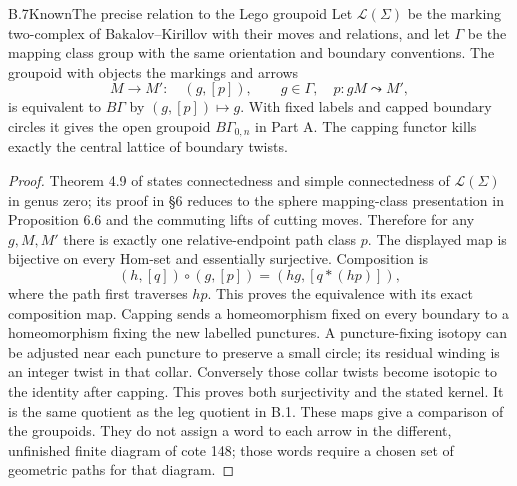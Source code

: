 \begin{result}{B.7}{Known}{The precise relation to the Lego groupoid}
Let $\mathcal L(\Sigma)$ be the marking two-complex of
Bakalov--Kirillov with their moves and relations, and let $\Gamma$
be the mapping class group with the same orientation and boundary
conventions.  The groupoid with objects the markings and arrows
\[
 M\longrightarrow M':\quad (g,[p]),\qquad
 g\in\Gamma,\quad p:gM\leadsto M',
\]
is equivalent to $B\Gamma$ by $(g,[p])\mapsto g$.  With fixed labels
and capped boundary circles it gives the open groupoid
$B\Gamma_{0,n}$ in Part A.  The capping functor kills exactly the
central lattice of boundary twists.
\end{result}
\begin{proof}
Theorem 4.9 of \citet{B_BakalovKirillov} states connectedness and
simple connectedness of $\mathcal L(\Sigma)$ in genus zero; its
proof in \S6 reduces to the sphere mapping-class presentation in
Proposition 6.6 and the commuting lifts of cutting moves.  Therefore
for any $g,M,M'$ there is exactly one relative-endpoint path class
$p$.  The displayed map is bijective on every Hom-set and
essentially surjective.  Composition is
\[
 (h,[q])\circ(g,[p])=(hg,[q*(hp)]),
\]
where the path first traverses $hp$.  This proves the equivalence
with its exact composition map.  Capping sends a homeomorphism
fixed on every boundary to a homeomorphism fixing the new labelled
punctures.  A puncture-fixing isotopy can be adjusted near each
puncture to preserve a small circle; its residual winding is an
integer twist in that collar.  Conversely those collar twists
become isotopic to the identity after capping.  This proves both
surjectivity and the stated kernel.  It is the same quotient as the
leg quotient in B.1.  These maps give a comparison of the groupoids.
They do not assign a word to each arrow in the different, unfinished
finite diagram of cote 148; those words require a chosen set of
geometric paths for that diagram.
\end{proof}


